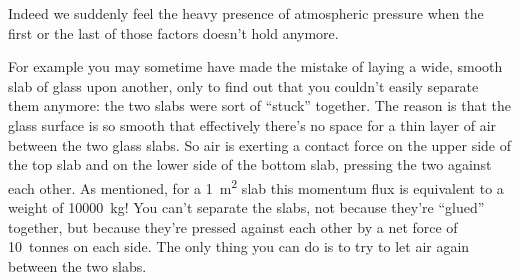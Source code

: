 \documentclass[a4paper,12pt,%
onecolumn,oneside,%
british%
]{memoir}
\renewcommand*{\|}[1][]{\nonscript\:#1\vert\nonscript\:\mathopen{}}
\begin{document}
Indeed we suddenly feel the heavy presence of atmospheric pressure when the first or the last of those factors doesn't hold anymore.

%
%
For example you may sometime have made the mistake of laying a wide, smooth slab of glass upon another, only to find out that you couldn't easily separate them anymore: the two slabs were sort of \enquote{stuck} together.
The reason is that the glass surface is so smooth that effectively there's no space for a thin layer of air between the two glass slabs. So air is exerting a contact force on the upper side of the top slab and on the lower side of the bottom slab, pressing the two against each other. As mentioned, for a \qty{1}{m^2} slab this momentum flux is equivalent to a weight of \qty{10000}{kg}! You can't separate the slabs, not because they're \enquote{glued} together, but because they're pressed against each other by a net force of \qty{10}{tonnes} on each side. The only thing you can do is to try to let air again between the two slabs.
\end{document}
